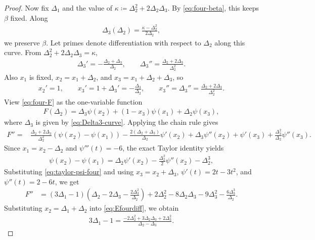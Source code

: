 \documentclass[10pt,a4paper]{article}
\begin{document}
\begin{proof}
Now fix $\Delta_1$ and the value of
$\kappa\coloneqq\Delta_2^2+2\Delta_2\Delta_3.$
By \eqref{eq:four-beta}, this keeps $\beta$ fixed.  Along
\begin{align}\label{eq:Delta3-curve}
  \Delta_3(\Delta_2)=\frac{\kappa-\Delta_2^2}{2\Delta_2},
\end{align}
we preserve $\beta$.  Let primes denote differentiation with respect to $\Delta_2$ along this curve.  From $\Delta_2^2+2\Delta_2\Delta_3=\kappa$,
\begin{align*}
  \Delta_3'=-\frac{\Delta_2+\Delta_3}{\Delta_2},
  \qquad
  \Delta_3''=\frac{\Delta_2+2\Delta_3}{\Delta_2^2}.
\end{align*}
Also $x_1$ is fixed, $x_2=x_1+\Delta_2$, and $x_3=x_1+\Delta_2+\Delta_3$, so
\begin{align*}
  x_2'=1,
  \qquad
  x_3'=1+\Delta_3'=-\frac{\Delta_3}{\Delta_2},
  \qquad
  x_3''=\Delta_3''=\frac{\Delta_2+2\Delta_3}{\Delta_2^2}.
\end{align*}
View \eqref{eq:four-F} as the one-variable function
\begin{align*}
  F(\Delta_2)=\Delta_3\psi(x_2)+(1-x_3)\psi(x_1)+\Delta_2\psi(x_3),
\end{align*}
where $\Delta_3$ is given by \eqref{eq:Delta3-curve}.  Applying the chain rule gives
\begin{align}\label{eq:four-gap-Fpp-before}
F''={}&\frac{\Delta_2+2\Delta_3}{\Delta_2^2}(\psi(x_2)-\psi(x_1))
-\frac{2(\Delta_2+\Delta_3)}{\Delta_2}\psi'(x_2)+\Delta_3\psi''(x_2)+\psi'(x_3)+\frac{\Delta_3^2}{\Delta_2}\psi''(x_3).
\end{align}
Since $x_1=x_2-\Delta_2$ and $\psi'''(t)=-6$, the exact Taylor identity yields
\begin{align}\label{eq:taylor-psi-four}
  \psi(x_2)-\psi(x_1)=\Delta_2\psi'(x_2)-\frac{\Delta_2^2}{2}\psi''(x_2)-\Delta_2^3,
\end{align}
Substituting \eqref{eq:taylor-psi-four} and using $x_3=x_2+\Delta_3$, $\psi'(t)=2t-3t^2$, and $\psi''(t)=2-6t$, we get
\begin{align*}
F''&=(3\Delta_1-1)\left(\Delta_2-2\Delta_3-\frac{2\Delta_3^2}{\Delta_2}\right)
+2\Delta_2^2-8\Delta_2\Delta_3-9\Delta_3^2-\frac{6\Delta_3^3}{\Delta_2}.
\end{align*}
Substituting $x_2=\Delta_1+\Delta_2$ into \eqref{eq:Efourdiff}, we obtain
\begin{align}\label{eq:delta1-rewrite}
  3\Delta_1-1=\frac{-2\Delta_2^2+3\Delta_2\Delta_3+2\Delta_3^2}{\Delta_2-\Delta_3}.
\end{align}

\end{proof}
\end{document}
